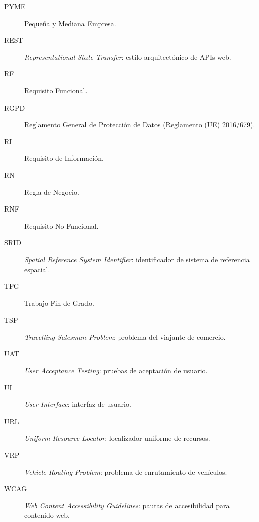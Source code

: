 \begin{description}
  \item[PYME] Pequeña y Mediana Empresa.
  \item[REST] \emph{Representational State Transfer}: estilo arquitectónico de APIs web.
  \item[RF] Requisito Funcional.
  \item[RGPD] Reglamento General de Protección de Datos (Reglamento (UE) 2016/679).
  \item[RI] Requisito de Información.
  \item[RN] Regla de Negocio.
  \item[RNF] Requisito No Funcional.
  \item[SRID] \emph{Spatial Reference System Identifier}: identificador de sistema de referencia espacial.
  \item[TFG] Trabajo Fin de Grado.
  \item[TSP] \emph{Travelling Salesman Problem}: problema del viajante de comercio.
  \item[UAT] \emph{User Acceptance Testing}: pruebas de aceptación de usuario.
  \item[UI] \emph{User Interface}: interfaz de usuario.
  \item[URL] \emph{Uniform Resource Locator}: localizador uniforme de recursos.
  \item[VRP] \emph{Vehicle Routing Problem}: problema de enrutamiento de vehículos.
  \item[WCAG] \emph{Web Content Accessibility Guidelines}: pautas de accesibilidad para contenido web.
\end{description}
